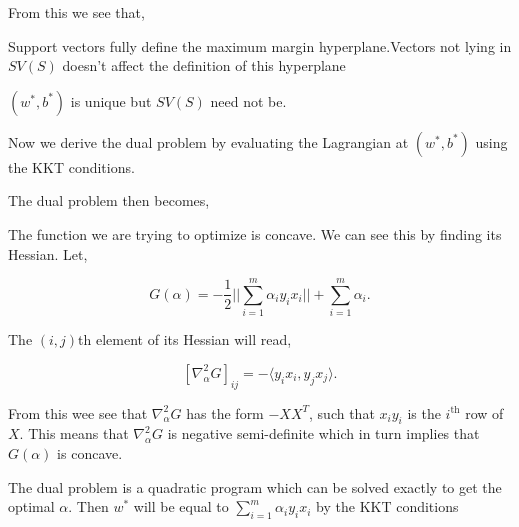 \documentclass[a4paper,english,12pt]{article}
\begin{document}
From this we see that,

\begin{rem}
Support vectors fully define the maximum margin hyperplane.Vectors not lying in $SV(S)$ doesn't affect the definition of this hyperplane
\end{rem}

\begin{rem}
$(w^*, b^*)$ is unique but $SV(S)$ need not be.
\end{rem}

Now we derive the dual problem by evaluating the Lagrangian at $(w^*, b^*)$ using the KKT conditions.


The dual problem then becomes,


The function we are trying to optimize is concave. We can see this by finding its Hessian. Let,

$$ G(\alpha) = -\frac12 || \sum_{i =1}^m \alpha_i y_i x_i || + \sum_{i = 1}^{m} \alpha_ i. $$

The $(i,j)$th element of its Hessian will read,

$$ [\nabla^2_\alpha G]_{ij} =  - \langle y_i x_i, y_j x_j \rangle. $$

From this wee see that $\nabla^2_\alpha G$ has the form $- XX^T$, such that $x_i y_i$ is the $i^{\text{th}}$ row of $X$. This means that $\nabla^2_\alpha G$ is negative semi-definite which in turn implies that $G(\alpha)$ is concave.

The dual problem is a quadratic program which can be solved exactly to get the optimal $\alpha$.  Then $w^*$ will be equal  to $\sum_{i =  1}^m \alpha_i y_i x_i $ by the KKT conditions
\end{document}
